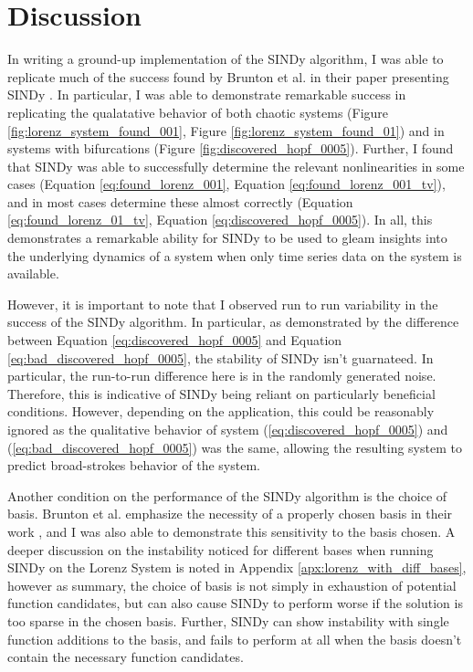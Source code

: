 \documentclass[10pt]{paper}
\begin{document}
\section{Discussion} \label{sec:discussion}

In writing a ground-up implementation of the SINDy algorithm, I was able to replicate much of the success found by Brunton et al. in their paper presenting SINDy \cite{sindy}. In particular, I was able to demonstrate 
remarkable success in replicating the qualatative behavior of both chaotic systems (Figure \ref{fig:lorenz_system_found_001}, Figure \ref{fig:lorenz_system_found_01}) and in systems with bifurcations (Figure \ref{fig:discovered_hopf_0005}). 
Further, I found that SINDy was able to successfully determine the relevant nonlinearities in some cases (Equation \ref{eq:found_lorenz_001}, Equation \ref{eq:found_lorenz_001_tv}), and in most cases determine these almost correctly (Equation \ref{eq:found_lorenz_01_tv}, Equation \ref{eq:discovered_hopf_0005}). 
In all, this demonstrates a remarkable ability for SINDy to be used to gleam insights into the underlying dynamics of a system when only time series data on the system is available. 

However, it is important to note that I observed run to run variability in the success of the SINDy algorithm. In particular, as demonstrated by the difference between Equation \ref{eq:discovered_hopf_0005} and Equation \ref{eq:bad_discovered_hopf_0005}, the stability of SINDy isn't guarnateed. 
In particular, the run-to-run difference here is in the randomly generated noise. Therefore, this is indicative of SINDy being reliant on particularly beneficial conditions. However, depending on the application, this could be reasonably ignored as the qualitative behavior of system (\ref{eq:discovered_hopf_0005}) and (\ref{eq:bad_discovered_hopf_0005}) was the same, allowing the resulting system to predict broad-strokes behavior of the system. 

Another condition on the performance of the SINDy algorithm is the choice of basis. Brunton et al. emphasize the necessity of a properly chosen basis in their work \cite{sindy}, and I was also able to demonstrate this sensitivity to the basis chosen. 
A deeper discussion on the instability noticed for different bases when running SINDy on the Lorenz System is noted in Appendix \ref{apx:lorenz_with_diff_bases}, however as summary, the choice of basis is not simply in exhaustion of potential function candidates, but can also cause SINDy to perform worse if the solution is too sparse in the chosen basis. 
Further, SINDy can show instability with single function additions to the basis, and fails to perform at all when the basis doesn't contain the necessary function candidates. 
\end{document}
